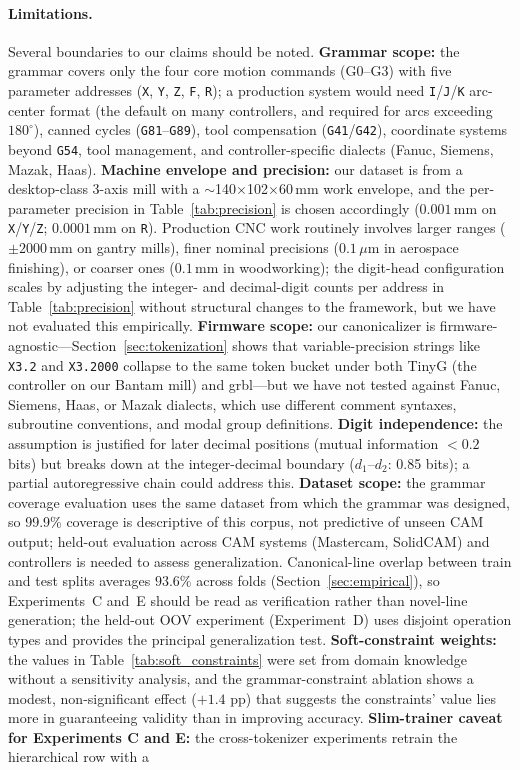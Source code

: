 \documentclass[11pt]{article}
\begin{document}
\paragraph{Limitations.}
Several boundaries to our claims should be noted. \textbf{Grammar scope:} the grammar covers only the four core motion commands (G0--G3) with five parameter addresses (\texttt{X}, \texttt{Y}, \texttt{Z}, \texttt{F}, \texttt{R}); a production system would need \texttt{I}/\texttt{J}/\texttt{K} arc-center format (the default on many controllers, and required for arcs exceeding $180^\circ$), canned cycles (\texttt{G81}--\texttt{G89}), tool compensation (\texttt{G41}/\texttt{G42}), coordinate systems beyond \texttt{G54}, tool management, and controller-specific dialects (Fanuc, Siemens, Mazak, Haas). \textbf{Machine envelope and precision:} our dataset is from a desktop-class 3-axis mill with a $\sim$140$\times$102$\times$60\,mm work envelope, and the per-parameter precision in Table~\ref{tab:precision} is chosen accordingly ($0.001$\,mm on \texttt{X}/\texttt{Y}/\texttt{Z}; $0.0001$\,mm on \texttt{R}). Production CNC work routinely involves larger ranges ($\pm 2000$\,mm on gantry mills), finer nominal precisions ($0.1\,\mu$m in aerospace finishing), or coarser ones ($0.1$\,mm in woodworking); the digit-head configuration scales by adjusting the integer- and decimal-digit counts per address in Table~\ref{tab:precision} without structural changes to the framework, but we have not evaluated this empirically. \textbf{Firmware scope:} our canonicalizer is firmware-agnostic---Section~\ref{sec:tokenization} shows that variable-precision strings like \texttt{X3.2} and \texttt{X3.2000} collapse to the same token bucket under both TinyG (the controller on our Bantam mill) and grbl---but we have not tested against Fanuc, Siemens, Haas, or Mazak dialects, which use different comment syntaxes, subroutine conventions, and modal group definitions. \textbf{Digit independence:} the assumption is justified for later decimal positions (mutual information $< 0.2$ bits) but breaks down at the integer-decimal boundary ($d_{1}$--$d_{2}$: 0.85 bits); a partial autoregressive chain could address this. \textbf{Dataset scope:} the grammar coverage evaluation uses the same dataset from which the grammar was designed, so 99.9\% coverage is descriptive of this corpus, not predictive of unseen CAM output; held-out evaluation across CAM systems (Mastercam, SolidCAM) and controllers is needed to assess generalization. Canonical-line overlap between train and test splits averages $93.6\%$ across folds (Section~\ref{sec:empirical}), so Experiments~C and~E should be read as verification rather than novel-line generation; the held-out OOV experiment (Experiment~D) uses disjoint operation types and provides the principal generalization test. \textbf{Soft-constraint weights:} the values in Table~\ref{tab:soft_constraints} were set from domain knowledge without a sensitivity analysis, and the grammar-constraint ablation shows a modest, non-significant effect ($+1.4$ pp) that suggests the constraints' value lies more in guaranteeing validity than in improving accuracy. \textbf{Slim-trainer caveat for Experiments C and E:} the cross-tokenizer experiments retrain the hierarchical row with a 
\end{document}
